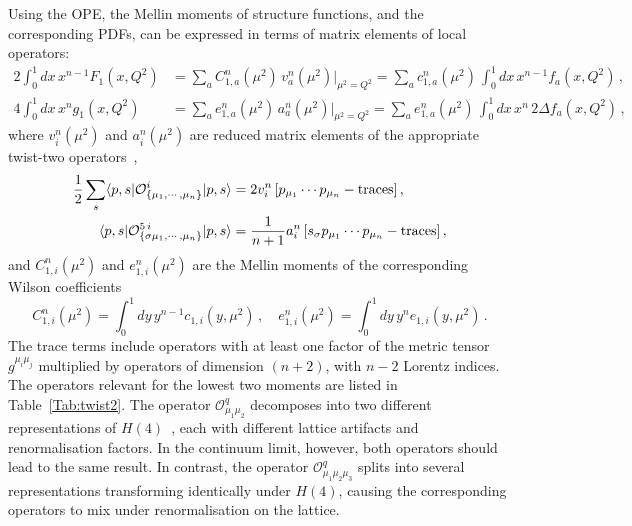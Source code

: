 Using the OPE, the Mellin moments of structure functions, 
and the corresponding PDFs, can be expressed in terms of matrix elements of 
local operators:
\begin{align}
\!\!\!2 \int_0^1 dx\, x^{n-1} F_1(x,Q^2) 
&= \sum_a C_{1,a}^n(\mu^2)\, v_a^n(\mu^2)|_{\mu^2=Q^2} 
= \sum_a c_{1,a}^n(\mu^2)\, \int_0^1 dx\, x^{n-1} f_a(x,Q^2)\,,\\
4 \int_0^1 dx\, x^n g_1(x,Q^2) 
&= \sum_a e_{1,a}^n(\mu^2)\, a_a^n(\mu^2)|_{\mu^2=Q^2} 
= \sum_a e_{1,a}^n(\mu^2)\, \int_0^1 dx\, x^n\, 2 \Delta f_a(x,Q^2)\,,
\end{align}
where $v_i^n(\mu^2)$ and $a_i^n(\mu^2)$ are reduced matrix elements of the 
appropriate twist-two operators~\cite{Gockeler:1995wg},
\begin{align}
\frac{1}{2} \sum_s \langle p,s|\mathcal{O}^i_{\{\mu_1,\cdots,\mu_n\}}|p,s\rangle 
= {} & 2 v_i^n\, [p_{\mu_1}\cdots p_{\mu_n} - {\rm traces}] \,, 
\label{eq:twist2me}\\
\langle p,s|\mathcal{O}^{5\,i}_{\{\sigma \mu_1,\cdots,\mu_n\}}|p,s\rangle 
= {} & \frac{1}{n+1} a_i^n\, [s_\sigma p_{\mu_1}\cdots p_{\mu_n} - {\rm traces}]\,,
\end{align}
and $C_{1,i}^n(\mu^2)$ and $e_{1,i}^n(\mu^2)$ are the Mellin moments 
of the corresponding Wilson coefficients
\begin{equation}
C_{1,i}^n(\mu^2) = \int_0^1 dy\, y^{n-1} c_{1,i}(y,\mu^2)\,, \quad
e_{1,i}^n(\mu^2) = \int_0^1 dy\, y^n e_{1,i}(y,\mu^2)\,.
\end{equation}
%
The trace terms include operators with at least one factor of the metric 
tensor $g^{\mu_i \mu_j}$ multiplied by operators of dimension $(n+2)$, 
with $n-2$ Lorentz indices. 
%
The operators relevant for the lowest two moments are listed in 
Table~\ref{Tab:twist2}. 
%
The operator $\mathcal{O}^q_{\mu_1\mu_2}$ decomposes into two different 
representations of $H(4)$~\cite{Gockeler:1996mu}, each with different 
lattice artifacts and renormalisation factors. 
%
In the continuum limit, however, both operators should lead to the same result.
% 
In contrast, the operator $\mathcal{O}^q_{\mu_1\mu_2\mu_3}$ splits into several 
representations transforming identically under $H(4)$, causing the 
corresponding operators to mix under renormalisation on the lattice.

